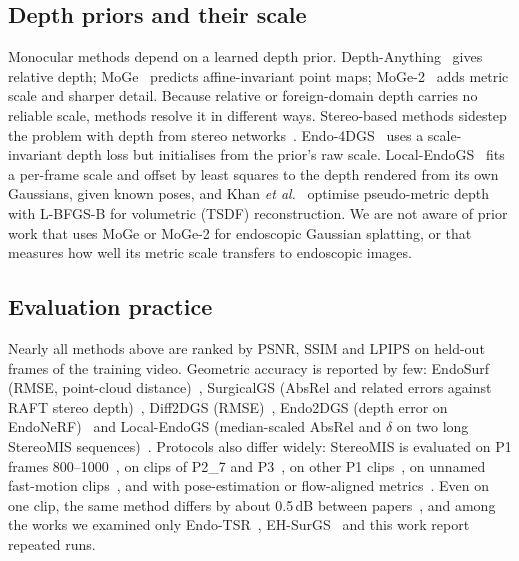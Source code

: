 \documentclass[conference]{IEEEtran}
\begin{document}
\subsection{Depth priors and their scale}
Monocular methods depend on a learned depth prior. Depth-Anything~\cite{yang2024depthanything} gives relative depth; MoGe~\cite{wang2025moge} predicts affine-invariant point maps; MoGe-2~\cite{wang2025moge2} adds metric scale and sharper detail. Because relative or foreign-domain depth carries no reliable scale, methods resolve it in different ways. Stereo-based methods sidestep the problem with depth from stereo networks~\cite{xie2024surgicalgaussian,chen2024surgicalgs,wu2026endotsr}. Endo-4DGS~\cite{huang2024endo4dgs} uses a scale-invariant depth loss but initialises from the prior's raw scale. Local-EndoGS~\cite{shan2026localendogs} fits a per-frame scale and offset by least squares to the depth rendered from its own Gaussians, given known poses, and Khan \emph{et al.}~\cite{khan2025unifying} optimise pseudo-metric depth with L-BFGS-B for volumetric (TSDF) reconstruction. We are not aware of prior work that uses MoGe or MoGe-2 for endoscopic Gaussian splatting, or that measures how well its metric scale transfers to endoscopic images.

\subsection{Evaluation practice}
Nearly all methods above are ranked by PSNR, SSIM and LPIPS on held-out frames of the training video. Geometric accuracy is reported by few: EndoSurf (RMSE, point-cloud distance)~\cite{zha2023endosurf}, SurgicalGS (AbsRel and related errors against RAFT stereo depth)~\cite{chen2024surgicalgs}, Diff2DGS (RMSE)~\cite{song2026diff2dgs}, Endo2DGS (depth error on EndoNeRF)~\cite{zhou2026endo2dgs} and Local-EndoGS (median-scaled AbsRel and $\delta$ on two long StereoMIS sequences)~\cite{shan2026localendogs}. Protocols also differ widely: StereoMIS is evaluated on P1 frames 800--1000~\cite{huang2024endo4dgs,liu2025endog2t,wu2025endowave,yu2026endopairgs}, on clips of P2\_7 and P3~\cite{yang2024deform3dgs,ji2025colorgs,song2026diff2dgs}, on other P1 clips~\cite{shan2025ehsurgs,huang2025endo4dgx}, on unnamed fast-motion clips~\cite{xie2024surgicalgaussian}, and with pose-estimation or flow-aligned metrics~\cite{gou2025endogsmt,li2024freedygs}. Even on one clip, the same method differs by about 0.5\,dB between papers~\cite{huang2024endo4dgs,yu2026endopairgs,liu2025endog2t}, and among the works we examined only Endo-TSR~\cite{wu2026endotsr}, EH-SurGS~\cite{shan2025ehsurgs} and this work report repeated runs.
\end{document}
